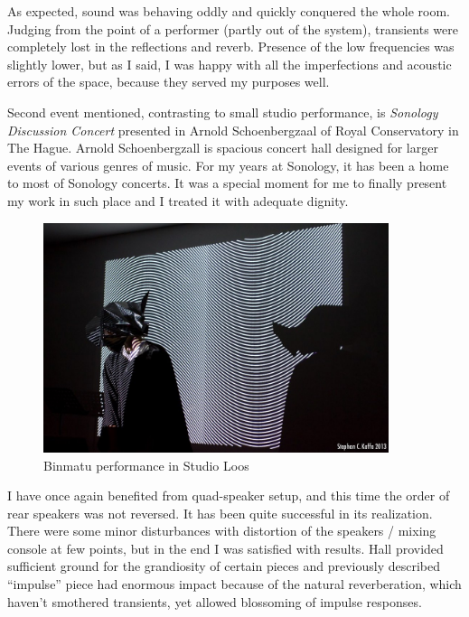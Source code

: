 \documentclass[12pt,a4paper,oneside]{report}
\begin{document}
As expected, sound was behaving oddly and quickly conquered the whole room. Judging from the point of a performer (partly out of the system), transients were completely lost in the reflections and reverb. Presence of the low frequencies was slightly lower, but as I said, I was happy with all the imperfections and acoustic errors of the space, because they served my purposes well.

Second event mentioned, contrasting to small studio performance, is \emph{Sonology Discussion Concert} presented in Arnold Schoenbergzaal of Royal Conservatory in The Hague. Arnold Schoenbergzall is spacious concert hall designed for larger events of various genres of music. For my years at Sonology, it has been a home to most of Sonology concerts. It was a special moment for me to finally present my work in such place and I treated it with adequate dignity.

\begin{figure}  
  \centering
    \includegraphics[width=0.9\textwidth]{img/binmatu_perfo}
	\caption{Binmatu performance in Studio Loos}
	\label{fig:binmatu_perfo}
\end{figure}

I have once again benefited from quad-speaker setup, and this time the order of rear speakers was not reversed. It has been quite successful in its realization. There were some minor disturbances with distortion of the speakers / mixing console at few points, but in the end I was satisfied with results. Hall provided sufficient ground for the grandiosity of certain pieces and previously described ``impulse'' piece had enormous impact because of the natural reverberation, which haven't smothered transients, yet allowed blossoming of impulse responses.
\end{document}
